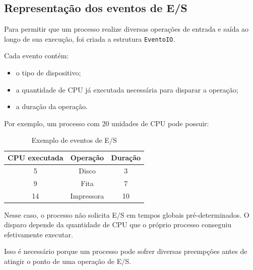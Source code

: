 \documentclass[12pt,a4paper]{article}
\begin{document}

\subsection{Representação dos eventos de E/S}

Para permitir que um processo realize diversas operações de entrada e
saída ao longo de sua execução, foi criada a estrutura
\texttt{EventoIO}.

Cada evento contém:

\begin{itemize}

    \item o tipo de dispositivo;

    \item a quantidade de CPU já executada necessária para disparar a
    operação;

    \item a duração da operação.

\end{itemize}

Por exemplo, um processo com 20 unidades de CPU pode possuir:

\begin{table}[H]
    \centering
    \caption{Exemplo de eventos de E/S}
    \begin{tabular}{ccc}
        \toprule
        \textbf{CPU executada} &
        \textbf{Operação} &
        \textbf{Duração} \\
        \midrule
        5  & Disco      & 3 \\
        9  & Fita       & 7 \\
        14 & Impressora & 10 \\
        \bottomrule
    \end{tabular}
\end{table}

Nesse caso, o processo não solicita E/S em tempos globais
pré-determinados. O disparo depende da quantidade de CPU que o próprio
processo conseguiu efetivamente executar.

Isso é necessário porque um processo pode sofrer diversas
preempções antes de atingir o ponto de uma operação de E/S.


\end{document}
